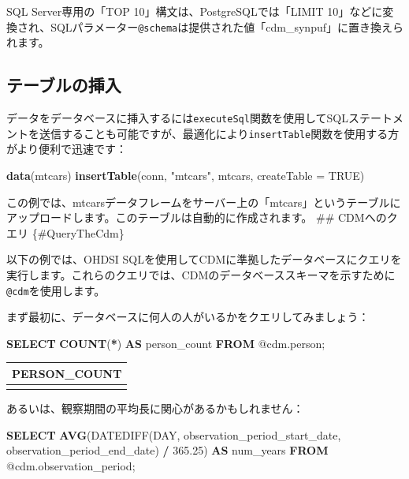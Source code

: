 \documentclass[
  11pt]{book}
\newenvironment{Shaded}{\begin{snugshade}}{\end{snugshade}}
\newcommand{\AttributeTok}[1]{\textcolor[rgb]{0.13,0.29,0.53}{#1}}
\newcommand{\ConstantTok}[1]{\textcolor[rgb]{0.56,0.35,0.01}{#1}}
\newcommand{\DataTypeTok}[1]{\textcolor[rgb]{0.13,0.29,0.53}{#1}}
\newcommand{\FloatTok}[1]{\textcolor[rgb]{0.00,0.00,0.81}{#1}}
\newcommand{\FunctionTok}[1]{\textcolor[rgb]{0.13,0.29,0.53}{\textbf{#1}}}
\newcommand{\KeywordTok}[1]{\textcolor[rgb]{0.13,0.29,0.53}{\textbf{#1}}}
\newcommand{\NormalTok}[1]{#1}
\newcommand{\OperatorTok}[1]{\textcolor[rgb]{0.81,0.36,0.00}{\textbf{#1}}}
\newcommand{\StringTok}[1]{\textcolor[rgb]{0.31,0.60,0.02}{#1}}
\theoremstyle{definition}
\theoremstyle{definition}
\theoremstyle{definition}
\theoremstyle{definition}
\theoremstyle{remark}
\begin{document}
SQL Server専用の「TOP 10」構文は、PostgreSQLでは「LIMIT 10」などに変換され、SQLパラメーター\texttt{@schema}は提供された値「cdm\_synpuf」に置き換えられます。

\subsection{テーブルの挿入}\label{ux30c6ux30fcux30d6ux30ebux306eux633fux5165}

データをデータベースに挿入するには\texttt{executeSql}関数を使用してSQLステートメントを送信することも可能ですが、最適化により\texttt{insertTable}関数を使用する方がより便利で迅速です：

\begin{Shaded}
\begin{Highlighting}[]
\FunctionTok{data}\NormalTok{(mtcars)}
\FunctionTok{insertTable}\NormalTok{(conn, }\StringTok{"mtcars"}\NormalTok{, mtcars, }\AttributeTok{createTable =} \ConstantTok{TRUE}\NormalTok{)}
\end{Highlighting}
\end{Shaded}

この例では、mtcarsデータフレームをサーバー上の「mtcars」というテーブルにアップロードします。このテーブルは自動的に作成されます。
\#\# CDMへのクエリ \{\#QueryTheCdm\}

以下の例では、OHDSI SQLを使用してCDMに準拠したデータベースにクエリを実行します。これらのクエリでは、CDMのデータベーススキーマを示すために\texttt{@cdm}を使用します。

まず最初に、データベースに何人の人がいるかをクエリしてみましょう：

\begin{Shaded}
\begin{Highlighting}[]
\KeywordTok{SELECT} \FunctionTok{COUNT}\NormalTok{(}\OperatorTok{*}\NormalTok{) }\KeywordTok{AS}\NormalTok{ person\_count }\KeywordTok{FROM}\NormalTok{ @cdm.person;}
\end{Highlighting}
\end{Shaded}

\begin{longtable}[]{@{}r@{}}
\toprule\noalign{}
PERSON\_COUNT \\
\midrule\noalign{}
\endhead
\bottomrule\noalign{}
\endlastfoot
26299001 \\
\end{longtable}

あるいは、観察期間の平均長に関心があるかもしれません：

\begin{Shaded}
\begin{Highlighting}[]
\KeywordTok{SELECT} \FunctionTok{AVG}\NormalTok{(DATEDIFF(}\DataTypeTok{DAY}\NormalTok{,}
\NormalTok{                    observation\_period\_start\_date,}
\NormalTok{                    observation\_period\_end\_date) }\OperatorTok{/} \FloatTok{365.25}\NormalTok{) }\KeywordTok{AS}\NormalTok{ num\_years}
\KeywordTok{FROM}\NormalTok{ @cdm.observation\_period;}
\end{Highlighting}
\end{Shaded}
\end{document}
